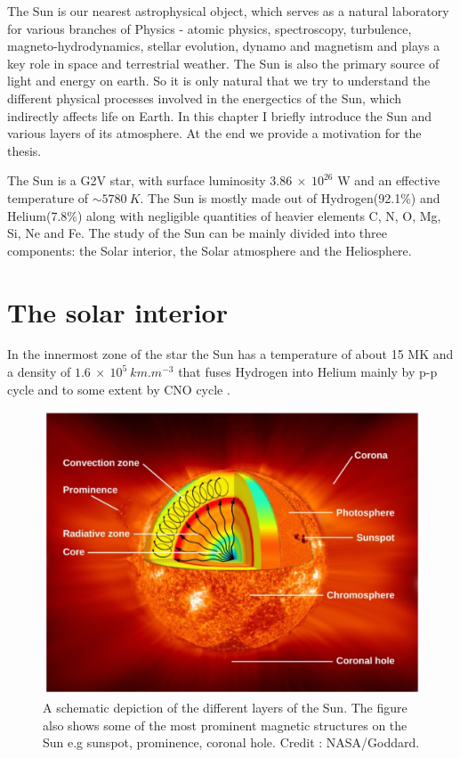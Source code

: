 \justifying

The Sun is our nearest astrophysical object, which serves as a natural laboratory for various branches of Physics - atomic physics, spectroscopy, turbulence, magneto-hydrodynamics, stellar evolution, dynamo and magnetism and plays a key role in space and terrestrial weather. The Sun is also the primary source of light and energy on earth. So it is only natural that we try to understand the different physical processes involved in the energectics of the Sun, which indirectly affects life on Earth. In this chapter I briefly introduce the Sun and various layers of its atmosphere. At the end we provide a motivation for the thesis.

The Sun is a G2V star, with surface luminosity $3.86~\times~10^{26}$ W and an effective temperature of $\sim 5780~K$. The Sun is mostly made out of Hydrogen(92.1\%) and Helium(7.8\%) along with negligible quantities of heavier elements C, N, O, Mg, Si, Ne and Fe. The study of the Sun can be mainly divided into three components: the Solar interior, the Solar atmosphere and the Heliosphere.

\section{The solar interior}\label{solar_int}

In the innermost zone of the star the Sun has a temperature of about 15 MK and a density of $1.6~\times~10^{5}~km.m^{-3}$ that fuses Hydrogen into Helium mainly by p-p cycle \citep{bethe38} and to some extent by CNO cycle \citep{bethe39}. 

\begin{figure}[h!]
    \centering
    \includegraphics[width = 0.8\linewidth]{Figures/solar_int.png}
    \caption{A schematic depiction of the different layers of the Sun. The figure also shows some of the most prominent magnetic structures on the Sun e.g sunspot, prominence, coronal hole. Credit : NASA/Goddard.}
    \label{fig_solar_int}
\end{figure}

